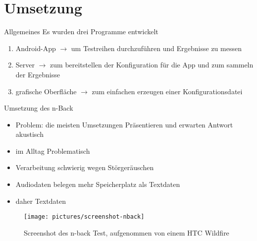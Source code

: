 \section{Umsetzung}

\begin{frame}{Allgemeines}
	Es wurden drei Programme entwickelt
	\pause
	\begin{enumerate}[<+->]
	\item Android-App $\rightarrow$ um Testreihen durchzuführen und Ergebnisse zu messen
	\item Server $\rightarrow$ zum bereitstellen der Konfiguration für die App und zum sammeln der Ergebnisse
	\item grafische Oberfläche $\rightarrow$ zum einfachen erzeugen einer Konfigurationsdatei
	\end{enumerate}
\end{frame}
\begin{frame}{Umsetzung des n-Back}
	\begin{itemize}[<+->]
	\item Problem: die meisten Umsetzungen Präsentieren und erwarten Antwort akustisch
	\item im Alltag Problematisch
	\item Verarbeitung schwierig wegen Störgeräuschen
	\item Audiodaten belegen mehr Speicherplatz als Textdaten
	\item daher Textdaten
	\end{itemize}
\end{frame}
\begin{frame}
	\begin{figure}[hbtp]
	\centering
	\texttt{[image: pictures/screenshot-nback]}
	\caption{Screenshot des n-back Test, aufgenommen von einem HTC Wildfire}
	\label{fig:sreen-nback}
	\end{figure}	
\end{frame}
